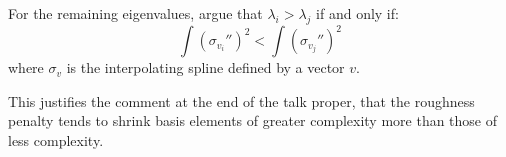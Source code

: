 %
%
\begin{frame}
  For the remaining eigenvalues, argue that $\lambda_i > \lambda_j$ if and only if:
  $$ \int (\sigma_{v_i}'')^2 < \int (\sigma_{v_j}'')^2 $$
where $\sigma_v$ is the interpolating spline defined by a vector $v$.

  This justifies the comment at the end of the talk proper, that the roughness penalty tends to shrink basis elements of greater complexity more than those of less complexity.
\end{frame}
